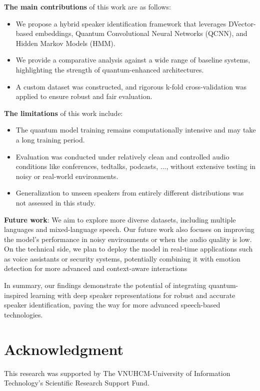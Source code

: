 \documentclass[conference]{IEEEtran}
\begin{document}
\textbf{The main contributions} of this work are as follows:
\begin{itemize}
    \item We propose a hybrid speaker identification framework that leverages DVector-based embeddings, Quantum Convolutional Neural Networks (QCNN), and Hidden Markov Models (HMM).
    \item We provide a comparative analysis against a wide range of baseline systems, highlighting the strength of quantum-enhanced architectures.
    \item A custom dataset was constructed, and rigorous k-fold cross-validation was applied to ensure robust and fair evaluation.
\end{itemize}

\textbf{The limitations} of this work include:
\begin{itemize}
    \item The quantum model training remains computationally intensive and may take a long training period.
    \item Evaluation was conducted under relatively clean and controlled audio conditions like conferences, tedtalks, podcasts, ..., without extensive testing in noisy or real-world environments.
    \item Generalization to unseen speakers from entirely different distributions was not assessed in this study.
\end{itemize}

\textbf{Future work}:
We aim to explore more diverse datasets, including multiple languages and mixed-language speech.
Our future work also focuses on improving the model's performance in noisy environments or when
the audio quality is low. On the technical side, we plan to deploy the model in real-time
applications such as voice assistants or security systems, potentially combining it with
emotion detection for more advanced and context-aware interactions

In summary, our findings demonstrate the potential of integrating quantum-inspired learning with deep speaker representations for robust and accurate speaker identification, paving the way for more advanced speech-based technologies.

\section{Acknowledgment}
This research was supported by The VNUHCM-University of Information Technology's Scientific Research Support Fund.



\end{document}
